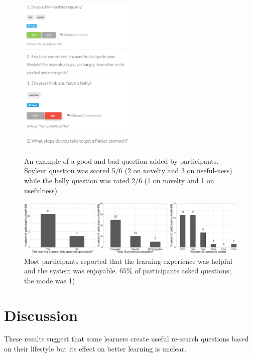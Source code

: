 \begin{figure}[h] 
  \centering
  \includegraphics[width=0.5\textwidth]{figures/gutinstinct/gi-8a.png}
  \includegraphics[width=0.5\textwidth]{figures/gutinstinct/gi-8b.png}
  \caption[]
{An example of a good and bad question added by participants. Soylent question was scored 5/6 (2 on novelty and 3 on useful-ness) while the belly question was rated 2/6 (1 on novelty and 1 on usefulness) }
  \label{fig:gi-8}
\end{figure}


\begin{figure}[h] 
  \centering
  \includegraphics[width=1.0\textwidth]{figures/gutinstinct/gi-9.png}
  \caption[]
{Most participants reported that the learning experience was helpful and the system was enjoyable. 65\% of participants asked questions; the mode was 1) }
  \label{fig:gi-8}
\end{figure}

\section{Discussion}
These results suggest that some learners create useful re-search questions based on their lifestyle but its effect on better learning is unclear.

